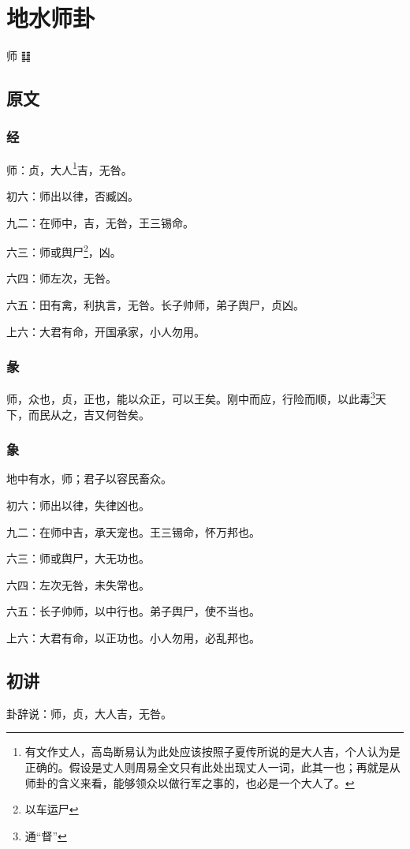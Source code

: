 \documentclass[12pt,oneside]{book}
\begin{document}
\chapter{地水师卦}
师 {\Large ䷆}

\section{原文}
\subsection{经}
师：贞，大人\footnote{有文作丈人，高岛断易认为此处应该按照子夏传所说的是大人吉，个人认为是正确的。假设是丈人则周易全文只有此处出现丈人一词，此其一也；再就是从师卦的含义来看，能够领众以做行军之事的，也必是一个大人了。}吉，无咎。

初六：师出以律，否臧凶。

九二：在师中，吉，无咎，王三锡命。

六三：师或舆尸\footnote{以车运尸}，凶。

六四：师左次，无咎。

六五：田有禽，利执言，无咎。长子帅师，弟子舆尸，贞凶。

上六：大君有命，开国承家，小人勿用。

\subsection{彖}
师，众也，贞，正也，能以众正，可以王矣。刚中而应，行险而顺，以此毒\footnote{通“督”}天下，而民从之，吉又何咎矣。

\subsection{象}
地中有水，师；君子以容民畜众。

初六：师出以律，失律凶也。

九二：在师中吉，承天宠也。王三锡命，怀万邦也。

六三：师或舆尸，大无功也。

六四：左次无咎，未失常也。

六五：长子帅师，以中行也。弟子舆尸，使不当也。

上六：大君有命，以正功也。小人勿用，必乱邦也。

\section{初讲}
卦辞说：师，贞，大人吉，无咎。
\end{document}
